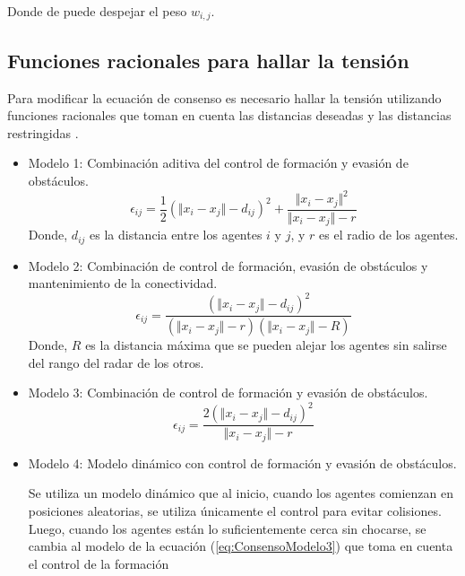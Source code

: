 Donde de puede despejar el peso $w_{i,j}$.

\subsection{Funciones racionales para hallar la tensión}
Para modificar la ecuación de consenso es necesario hallar la tensión utilizando funciones racionales que toman en cuenta las distancias deseadas y las distancias restringidas \cite{PenaAM_2019_tesis}.

\begin{itemize}
	\item Modelo 1: Combinación aditiva del control de formación y evasión de obstáculos.
	\begin{equation}
		\epsilon_{ij} = \frac{1}{2}(\Vert x_i - x_j \Vert - d_{ij})^2 + \frac{\Vert x_i - x_j \Vert^2}{\Vert x_i - x_j \Vert - r}
		\label{eq:ConsensoModelo1}
	\end{equation}
	Donde, $d_{ij}$ es la distancia entre los agentes $i$ y $j$, y $r$ es el radio de los agentes.
	
	\item Modelo 2: Combinación de control de formación, evasión de obstáculos y mantenimiento de la conectividad.
	\begin{equation}
		\epsilon_{ij} = \frac{(\Vert x_i - x_j \Vert - d_{ij})^2}{(\Vert x_i - x_j \Vert - r)(\Vert x_i - x_j \Vert - R)}
		\label{eq:ConsensoModelo2}
	\end{equation}
	Donde, $R$ es la distancia máxima que se pueden alejar los agentes sin salirse del rango del radar de los otros.
	
	\item Modelo 3: Combinación de control de formación y evasión de obstáculos.
	\begin{equation}
		\epsilon_{ij} = \frac{2(\Vert x_i - x_j \Vert - d_{ij})^2}{\Vert x_i - x_j \Vert - r}
		\label{eq:ConsensoModelo3}
	\end{equation}
	
	\item Modelo 4: Modelo dinámico con control de formación y evasión de obstáculos.\par
	
	Se utiliza un modelo dinámico que al inicio, cuando los agentes comienzan en posiciones aleatorias, se utiliza únicamente el control para evitar colisiones. Luego, cuando los agentes están lo suficientemente cerca sin chocarse, se cambia al modelo de la ecuación (\ref{eq:ConsensoModelo3}) que toma en cuenta el control de la formación 
	

\end{itemize}
